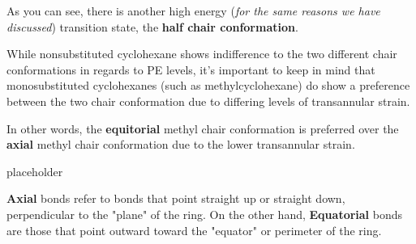 \documentclass[10pt]{article}
\begin{document}

  As you can see, there is another high energy (\textit{for the same reasons we have discussed}) transition state, the \textbf{half chair conformation}.

  While nonsubstituted cyclohexane shows indifference to the two different chair conformations in regards to PE levels, it's important to keep in mind that monosubstituted cyclohexanes (such as methylcyclohexane) do show a preference between the two chair conformation due to differing levels of transannular strain.


  In other words, the \textbf{equitorial} methyl chair conformation is preferred over the \textbf{axial} methyl chair conformation due to the lower transannular strain.

  \begin{definition}[label=filler2]{placeholder}

    \textbf{Axial} bonds refer to bonds that point straight up or straight down, perpendicular to the "plane" of the ring. On the other hand, \textbf{Equatorial} bonds are those that point outward toward the "equator" or perimeter of the ring.


  \end{definition}
\end{document}

